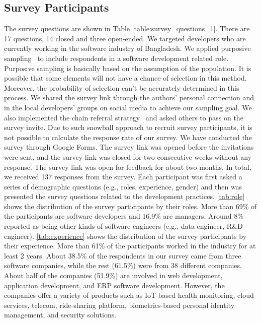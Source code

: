 \subsection{Survey Participants}
\label{survey_participants}

The survey questions are shown in Table \ref{table:survey_questions_1}. There are 17 questions, 14 closed and three open-ended.
We targeted developers who are currently working in the
software industry of Bangladesh. 
%
We applied purposive sampling~\citep{Vogt2005} to
include respondents in a software development related role. Purposive sampling
is basically based on the assumption of the population. It is possible that some
elements will not have a chance of selection in this method. Moreover, the
probability of selection can't be accurately determined in this process. We
shared the survey link through the authors' personal connection and in the local
developers' groups on social media to achieve our sampling goal. We also
implemented the chain referral strategy~\citep{creswell2013} and asked others to
pass on the survey invite. Due to such snowball approach to recruit survey participants, it is not possible to calculate the
response rate of our survey. We have conducted the survey through Google Forms. The survey link was opened
before the invitations were sent, and the survey link was closed for two
consecutive weeks without any response. The survey link was open for feedback
for about two months. In total, we
received 137 responses from the survey. Each participant was first asked a series of demographic questions (e.g., roles, experience, gender) and 
then was presented the survey questions related to the development practices. 
\tbl\ref{tab:role} shows the distribution of the survey participants by their roles. More than 69\% of the participants 
are software developers and 16.9\% are managers. Around 8\% reported as being other kinds of software engineers (e.g., data engineer, R\&D engineer). 
\tbl\ref{tab:experience} shows the distribution of the survey participants by their experience. More than 61\% of the participants worked in the
industry for at least 2 years. About 38.5\% of the respondents in our survey came from three software companies, while the rest (61.5\%) were from 38 
different companies. About half of the companies (51.9\%) are involved in web development, application development, and ERP software development. 
However, the companies offer a variety of products such as IoT-based health
monitoring, cloud services, telecom, ride-sharing platform, biometrics-based
personal identity management, and security solutions. 



